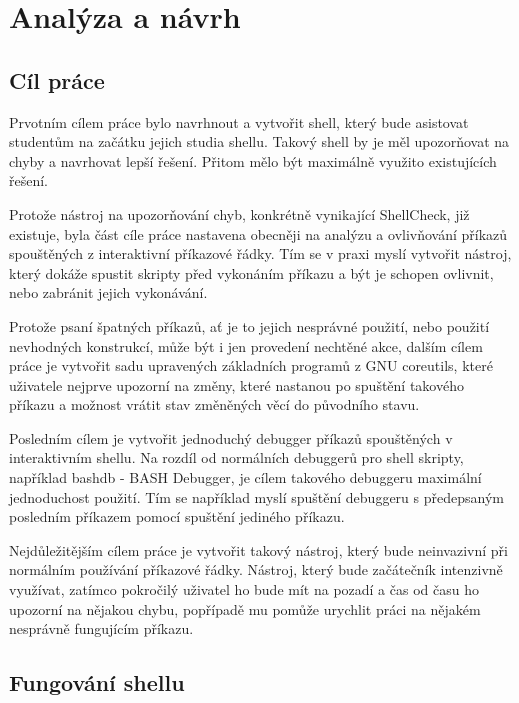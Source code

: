 \documentclass[thesis=M,czech]{FITthesis}[2012/06/26]
\begin{document}



%
%
%
\chapter{Analýza a návrh}

%
%
%
\section{Cíl práce}

Prvotním cílem práce bylo navrhnout a vytvořit shell, který bude asistovat studentům na začátku jejich studia shellu. Takový shell by je měl upozorňovat na chyby a navrhovat lepší řešení. Přitom mělo být maximálně využito existujících řešení.

Protože nástroj na upozorňování chyb, konkrétně vynikající ShellCheck, již existuje, byla část cíle práce nastavena obecněji na analýzu a ovlivňování příkazů spouštěných z interaktivní příkazové řádky. Tím se v praxi myslí vytvořit nástroj, který dokáže spustit skripty před vykonáním příkazu a být je schopen ovlivnit, nebo zabránit jejich vykonávání.

Protože psaní špatných příkazů, ať je to jejich nesprávné použití, nebo použití nevhodných konstrukcí, může být i jen provedení nechtěné akce, dalším cílem práce je vytvořit sadu upravených základních programů z GNU coreutils, které uživatele nejprve upozorní na změny, které nastanou po spuštění takového příkazu a možnost vrátit stav změněných věcí do původního stavu.

Posledním cílem je vytvořit jednoduchý debugger příkazů spouštěných v interaktivním shellu. Na rozdíl od normálních debuggerů pro shell skripty, například bashdb - BASH Debugger, je cílem takového debuggeru maximální jednoduchost použití. Tím se například myslí spuštění debuggeru s předepsaným posledním příkazem pomocí spuštění jediného příkazu.

Nejdůležitějším cílem práce je vytvořit takový nástroj, který bude neinvazivní při normálním používání příkazové řádky. Nástroj, který bude začátečník intenzivně využívat, zatímco pokročilý uživatel ho bude mít na pozadí a čas od času ho upozorní na nějakou chybu, popřípadě mu pomůže urychlit práci na nějakém nesprávně fungujícím příkazu.

%
%
%
\section{Fungování shellu}
\end{document}
